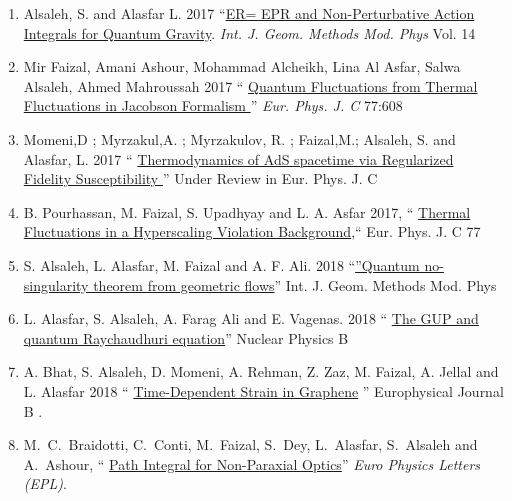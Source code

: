 \documentclass[11pt,article,oneside]{memoir}
\begin{document}
\begin{enumerate}

\item Alsaleh, S. and Alasfar L. 2017 ``\href{https://arxiv.org/abs/1611.02573}{ER= EPR and Non-Perturbative Action Integrals
	for Quantum Gravity}.\emph{	Int. J. Geom. Methods Mod. Phys }Vol. 14

\item Mir Faizal, Amani Ashour, Mohammad Alcheikh, Lina Al Asfar, Salwa Alsaleh, Ahmed Mahroussah 2017 `` \href{https://arxiv.org/abs/1710.06918}{Quantum Fluctuations from Thermal Fluctuations in Jacobson Formalism
}'' \emph{Eur. Phys. J. C } 77:608

\item Momeni,D ; Myrzakul,A. ; Myrzakulov, R. ; Faizal,M.; Alsaleh, S. and Alasfar,
L. 2017 `` \href{https://arxiv.org/abs/1704.05785}{Thermodynamics of AdS spacetime via Regularized Fidelity Susceptibility
}'' Under Review in Eur. Phys. J. C
\item B. Pourhassan, M. Faizal, S. Upadhyay and L. A. Asfar 2017, `` \href{https://arxiv.org/abs/1708.00438} {Thermal Fluctuations in a Hyperscaling
Violation Background},`` Eur. Phys. J. C 77 
\item  S. Alsaleh, L. Alasfar, M. Faizal and A. F. Ali. 2018 ``\href{Quantum no-singularity theorem from geometric flows
}{”Quantum no-singularity theorem
	from geometric flows}'' Int. J. Geom. Methods Mod. Phys

\item L. Alasfar, S. Alsaleh, A. Farag Ali and E. Vagenas. 2018 `` \href{https://arxiv.org/abs/1706.06502}{The GUP and quantum
	Raychaudhuri equation}'' Nuclear Physics B 

\item A. Bhat, S. Alsaleh, D. Momeni, A. Rehman, Z. Zaz,
M. Faizal, A. Jellal and L. Alasfar 2018 `` \href{https://arxiv.org/abs/1803.00051}{Time-Dependent Strain in Graphene} ''  Europhysical  Journal B .

\item  M.~C.~Braidotti, C.~Conti, M.~Faizal, S.~Dey, L.~Alasfar, S.~Alsaleh and A.~Ashour, `` \href{https://arxiv.org/abs/1803.10218}{Path Integral for Non-Paraxial Optics}'' \emph{Euro Physics Letters (EPL)}. 



\end{enumerate}
\end{document}
